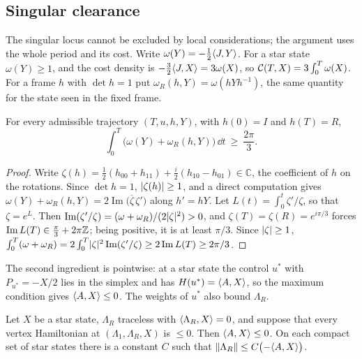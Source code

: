 \subsection{Singular clearance}\label{red:clearance-sec}

The singular locus cannot be excluded by local considerations; the argument uses the whole
period and its cost. Write $\omega(Y)=-\frac12\langle J,Y\rangle$. For a star state $\omega(Y)\ge1$, and
the cost density is $-\frac32\langle J,X\rangle=3\omega(X)$, so $\mathcal{C}(T,X)=3\int_0^T\omega(X)$. For a
frame $h$ with $\det h=1$ put $\omega_R(h,Y)=\omega(hYh^{-1})$, the same quantity for the state
seen in the fixed frame.

\begin{lemma}[Winding]\label{red:winding}
For every admissible trajectory $(T,u,h,Y)$, with $h(0)=I$ and $h(T)=R$,
\[
\int_0^T\bigl(\omega(Y)+\omega_R(h,Y)\bigr)\,\dd t\ \ge\ \frac{2\pi}3.
\]
\end{lemma}

\begin{proof}
Write $\zeta(h)=\frac12(h_{00}+h_{11})+\frac i2(h_{10}-h_{01})\in\mathbb C$, the coefficient of
$h$ on the rotations. Since $\det h=1$, $\lvert \zeta(h)\rvert\ge1$, and a direct computation gives
$\omega(Y)+\omega_R(h,Y)=2\operatorname{Im}\bigl(\overline{\zeta}\,\zeta'\bigr)$ along $h'=hY$. Let $L(t)=\int_0^t\zeta'/\zeta$, so that $\zeta=e^{L}$. Then
$\operatorname{Im}(\zeta'/\zeta)=(\omega+\omega_R)/(2\lvert \zeta\rvert^2)>0$, and
$\zeta(T)=\zeta(R)=e^{i\pi/3}$ forces $\operatorname{Im}L(T)\in\frac\pi3+2\pi\mathbb{Z}$; being positive,
it is at least $\pi/3$. Since $\lvert \zeta\rvert\ge1$,
$\int_0^T(\omega+\omega_R)=2\int_0^T\lvert \zeta\rvert^2\operatorname{Im}(\zeta'/\zeta)
\ge2\operatorname{Im}L(T)\ge2\pi/3$.
\end{proof}

The second ingredient is pointwise: at a star state the control $u^*$ with $P_{u^*}=-X/2$ lies
in the simplex and has $H(u^*)=\langle A,X\rangle$, so the maximum condition gives $\langle A,X\rangle\le0$. The
weights of $u^*$ also bound $\Lambda_R$.

\begin{lemma}\label{red:equilibrium}
Let $X$ be a star state, $\Lambda_R$ traceless with $\langle \Lambda_R,X\rangle=0$, and suppose that every
vertex Hamiltonian at $(\Lambda_1,\Lambda_R,X)$ is $\le0$. Then $\langle A,X\rangle\le0$. On each compact
set of star states there is a constant $C$ such that
$\lVert \Lambda_R\rVert\le C\bigl(-\langle A,X\rangle\bigr)$.
\end{lemma}

